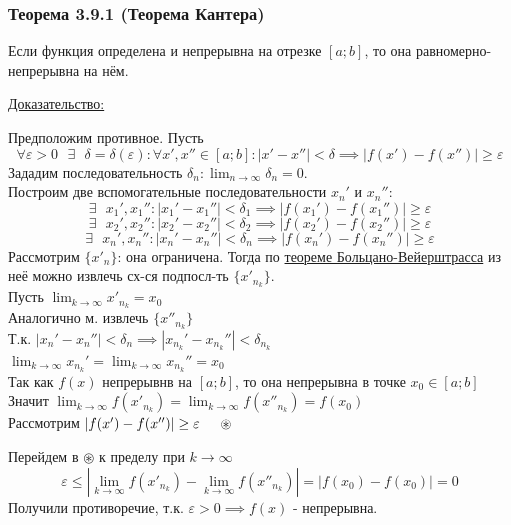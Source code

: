 \documentclass[12pt]{article}
\def\posl#1#2{\{#1_{#2}\}}
\begin{document}
    \subsubsection*{Теорема 3.9.1 (Теорема Кантера)}\label{th:3.9.1}
    Если функция определена и непрерывна на отрезке $[a; b]$, то она равномерно-непрерывна на нём.\par\noindent
    \underline{Доказательство:}
    \begin{adjustwidth}{1.5em}{1.5em}
        Предположим противное. Пусть \[\forall \varepsilon > 0 \text{ } \exists \text{ } \delta = \delta(\varepsilon) : \forall x', x'' \in [a;b] :  |x' - x''| < \delta \implies |f(x') - f(x'')| \ge \varepsilon \]
        Зададим последовательность $\delta_n : \lim_{n\to\infty} \delta_n = 0$.\\
        Построим две вспомогательные последовательности $x_n'$ и $x_n''$:
        \[ \exists \text{ } x_1', x_1'' : |x_1' - x_1''| < \delta_1 \implies |f(x_1') - f(x_1'')| \ge \varepsilon \]
        \[ \exists \text{ } x_2', x_2'' : |x_2' - x_2''| < \delta_2 \implies |f(x_2') - f(x_2'')| \ge \varepsilon \]
        \[ \exists \text{ } x_n', x_n'' : |x_n' - x_n''| < \delta_n \implies |f(x_n') - f(x_n'')| \ge \varepsilon \]
        Рассмотрим $\posl{x'}{n}$: она ограничена. Тогда по \hyperref[th:2.8.1]{теореме Больцано-Вейерштрасса} из неё можно извлечь сх-ся подпосл-ть $\posl{x'}{n_k}$.\\
        Пусть $\lim_{k\to\infty} x'_{n_k} = x_0$\\
        Аналогично м. извлечь $\posl{x''}{n_k}$\\
        Т.к. $|x_n' - x_n''| < \delta_n \implies |x_{n_k}' - x_{n_k}''| < \delta_{n_k}$\\
        $\lim_{k\to\infty}x_{n_k}' = \lim_{k\to\infty}x_{n_k}'' = x_0$\\
        Так как $f(x)$ непрерывнв на $[a; b]$, то она непрерывна в точке $x_0 \in [a;b]$\\
        Значит $\lim_{k\to\infty}f(x'_{n_k}) = \lim_{k\to\infty}f(x''_{n_k}) = f(x_0)$\\
        Рассмотрим $|f(x') - f(x'')| \ge \varepsilon \indent \circledast$
        \begin{adjustwidth}{1.5em}{1.5em}
            Перейдем в $\circledast$ к пределу при $k \to \infty$
            \[ \varepsilon \le | \lim_{k\to\infty}f(x'_{n_k}) - \lim_{k\to\infty}f(x''_{n_k})| = |f(x_0) - f(x_0)| = 0 \]
            Получили противоречие, т.к. $\varepsilon > 0 \implies f(x)$ - непрерывна.
        \end{adjustwidth}
    \end{adjustwidth}
\end{document}
